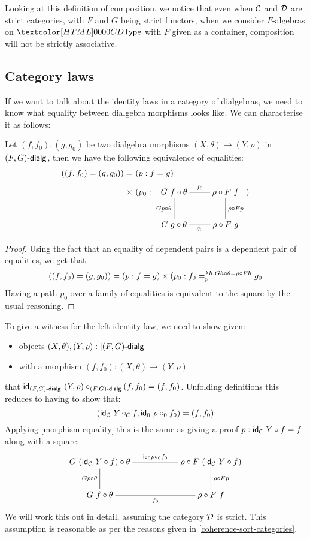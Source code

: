 Looking at this definition of composition, we notice that even when
$\Cc$ and $\Dd$ are strict categories, with $F$ and $G$ being strict
functors, \eg when we consider $F$-algebras on $\Type$ with $F$ given
as a container, composition will not be strictly associative.

\subsection{Category laws}

If we want to talk about the identity laws in a category of
dialgebras, we need to know what equality between dialgebra morphisms
looks like. We can characterise it as follows:

\begin{proposition}
  \label{morphism-equality}
  Let $(f,f_0),(g,g_0)$ be two dialgebra morphisms
  $(X,\theta) \to (Y,\rho)$ in $\dialgcat{F}{G}$, then we have the
  following equivalence of equalities:
  \begin{align*}
    ((f,f_0) = (g,g_0)) =&\ (p : f = g)\\
    \times&\ (p_0 : 
              \xymatrix{
              G\ f \circ \theta
              \ar@{-}[r]^{f_0}
              \ar@{-}[d]_{G p \circ \theta}
              &\rho \circ F\ f
              \ar@{-}[d]^{\rho \circ F p}
              \\
              G\ g \circ \theta
              \ar@{-}[r]_{g_0}
              &\rho \circ F\ g
              })
  \end{align*}
\end{proposition}

\begin{proof}
  Using the fact that an equality of dependent pairs is a dependent pair of equalities, we get that
  $$
  ((f,f_0) = (g,g_0)) = (p : f = g) \times (p_0 : \pathover{\lambda h . G h \circ \theta = \rho \circ F h}{p}{f_0}{g_0}
  $$
  Having a path $p_0$ over a family of equalities is equivalent to the
  square by the usual reasoning.
\end{proof}

To give a witness for the left identity law, we need to show given:
\begin{itemize}
\item objects $(X,\theta), (Y,\rho) : |\dialgcat{F}{G}|$
\item with a morphism $(f,f_0) : (X,\theta) \to (Y,\rho)$
\end{itemize}
that $\id_{\dialgcat{F}{G}}\ (Y,\rho) \circ_{\dialgcat{F}{G}} (f,f_0) = (f,f_0)$. Unfolding definitions this reduces to having to show that:
$$
(\id_{\Cc}\ Y \circ_{\Cc} f , \id_0\ \rho \circ_0 f_0) = (f,f_0)
$$
Applying \cref{morphism-equality} this is the same as giving a proof $p : \id_{\Cc}\ Y \circ f = f$ along with a square:
$$
\xymatrix{
  G\ (\id_{\Cc}\ Y \circ f) \circ \theta
  \ar@{-}[rr]^{\id_0 \rho \circ_0 f_0}
  \ar@{-}[d]_{G p \circ \theta}
  &&\rho \circ F\ (\id_{\Cc}\ Y \circ f)
  \ar@{-}[d]^{\rho \circ F p}
  \\
  G\ f \circ \theta
  \ar@{-}[rr]_{f_0}
  &&\rho \circ F\ f
}
$$
We will work this out in detail, assuming the category $\Dd$ is
strict. This assumption is reasonable as per the reasons given in
\cref{coherence-sort-categories}.

